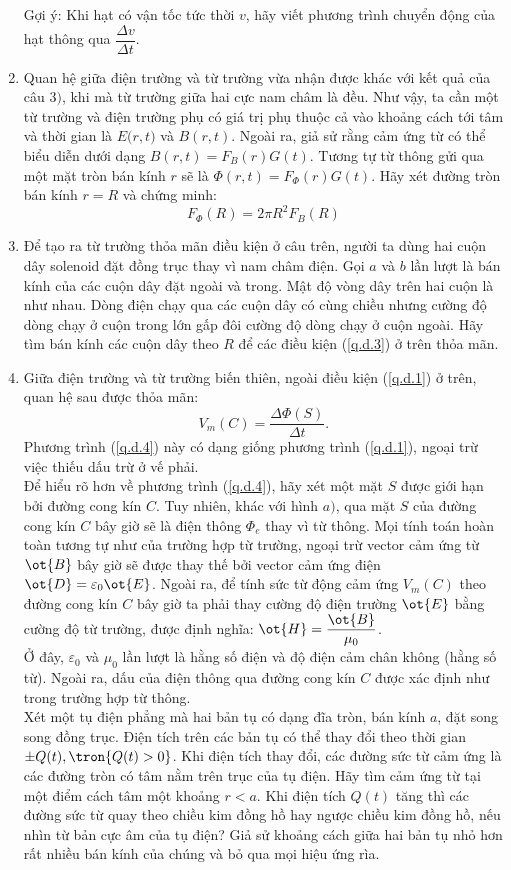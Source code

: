 \begin{vd}
\begin{enumerate}[1)]
Gợi ý: Khi hạt có vận tốc tức thời $v$, hãy viết phương trình chuyển động của hạt thông qua $\dfrac{\Delta v}{\Delta t}$.
\item Quan hệ giữa điện trường và từ trường vừa nhận được khác với kết quả của câu $3)$, khi mà từ trường giữa hai cực nam châm là đều. Như vậy, ta cần một từ trường và điện trường phụ có giá trị phụ thuộc cả vào khoảng cách tới tâm và thời gian là ${{E}(r}, {t})$ và ${B}({r}, {t})$. Ngoài ra, giả sử rằng cảm ứng từ có thể biểu diễn dưới dạng ${B}({r}, {t}) = {F}_{{B}}({r}) {G}({t})$. Tương tự từ thông gửi qua một mặt tròn bán kính ${r}$ sẽ là $\Phi({r}, {t}) = {F}_{\Phi}({r}) {G}({t})$. Hãy xét đường tròn bán kính ${r}={R}$ và chứng minh:
\[F_{\Phi}(R) = 2 \pi R^{2} F_{B}({R})\tag{3}\label{q.d.3} \]
\item Để tạo ra từ trường thỏa mãn điều kiện ở câu trên, người ta dùng hai cuộn dây solenoid đặt đồng trục thay vì nam châm điện. Gọi $a$ và $b$ lần lượt là bán kính của các cuộn dây đặt ngoài và trong. Mật độ vòng dây trên hai cuộn là như nhau. Dòng điện chạy qua các cuộn dây có cùng chiều nhưng cường độ dòng chạy ở cuộn trong lớn gấp đôi cường độ dòng chạy ở cuộn ngoài. Hãy tìm bán kính các cuộn dây theo ${R}$ để các điều kiện (\ref{q.d.3}) ở trên thỏa mãn.\\

\item Giữa điện trường và từ trường biến thiên, ngoài điều kiện (\ref{q.d.1}) ở trên, quan hệ sau được thỏa mãn:
\[V_{m}(C)=\frac{\Delta \Phi(S)}{\Delta t}. \tag{4}\label{q.d.4}\]
Phương trình (\ref{q.d.4}) này có dạng giống phương trình (\ref{q.d.1}), ngoại trừ việc thiếu dấu trừ ở vế phải.\\
Để hiểu rõ hơn về phương trình (\ref{q.d.4}), hãy xét một mặt $S$ được giới hạn bởi đường cong kín $C$. Tuy nhiên, khác với hình ${a})$, qua mặt ${S}$ của đường cong kín ${C}$ bây giờ sẽ là điện thông $\Phi_{e}$ thay vì từ thông. Mọi tính toán hoàn toàn tương tự như của trường hợp từ trường, ngoại trừ vector cảm ứng từ $\ot{B}$ bây giờ sẽ được thay thế bởi vector cảm ứng điện $\ot{D} = \varepsilon_{0} \ot{E}$. Ngoài ra, để tính sức từ động cảm ứng $V_{m}(C)$ theo đường cong kín ${C}$ bây giờ ta phải thay cường độ điện trường $\ot{E}$ bằng cường độ từ trường, được định nghĩa: $\ot{H} = \dfrac{\ot{B}}{\mu_{0}}$.\\
Ở đây, $\varepsilon_{0}$ và $\mu_{0}$ lần lượt là hằng số điện và độ điện cảm chân không (hằng số từ). Ngoài ra, dấu của điện thông qua đường cong kín ${C}$ được xác định như trong trường hợp từ thông.\\
Xét một tụ điện phẳng mà hai bản tụ có dạng đĩa tròn, bán kính ${a}$, đặt song song đồng trục. Điện tích trên các bản tụ có thể thay đổi theo thời gian $\pm {Q}({t}),\tron{{Q}({t})>0}$. Khi điện tích thay đổi, các đường sức từ cảm ứng là các đường tròn có tâm nằm trên trục của tụ điện. Hãy tìm cảm ứng từ tại một điểm cách tâm một khoảng ${r} < {a}$. Khi điện tích ${Q}({t})$ tăng thì các đường sức từ quay theo chiều kim đồng hồ hay ngược chiều kim đồng hồ, nếu nhìn từ bản cực âm của tụ điện? Giả sử khoảng cách giữa hai bản tụ nhỏ hơn rất nhiều bán kính của chúng và bỏ qua mọi hiệu ứng rìa.
\end{enumerate}
\end{vd}
